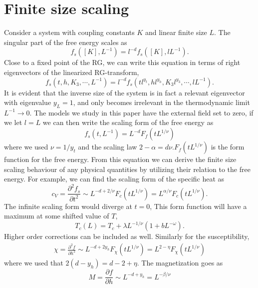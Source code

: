 \section{Finite size scaling}
Consider a system with coupling constants $K$ and linear finite size $L$. 
The singular part of the free energy scales as
\begin{equation}
  f_s([K],L^{-1}) = l^{-d}f_s([K],lL^{-1}).
  \label{}
\end{equation}
Close to a fixed point of the RG, we can write this equation in terms of right eigenvectors of the linearized RG-transform,
\begin{equation}
  f_s(t,h,K_3,\cdots,L^{-1}) = l^{-d}f_s(tl^{y_t},hl^{y_h},K_3 l^{y_3},\cdots,lL^{-1}).
  \label{}
\end{equation}
It is evident that the inverse size of the system is in fact a relevant eigenvector with eigenvalue $y_L = 1$, and only becomes irrelevant in the thermodynamic limit $L^{-1}\rightarrow 0$.
The models we study in this paper have the external field set to zero, if we let $l = L$ we can then write the scaling form of the free energy as
\begin{equation}
  f_s(t,L^{-1}) = L^{-d} F_f(t L^{1/\nu})
  \label{}
\end{equation}
where we used $\nu = 1/y_t$ and the scaling law $2 -\alpha = d\nu$.$F_f(tL^{1/\nu})$ is the form function for the free energy.
From this equation we can derive the finite size scaling behaviour of any physical quantities by utilizing their relation to the free energy. 
For example, we can find the scaling form of the specific heat as
\begin{equation}
  c_V = \frac{\partial ^2 f_s}{\partial t^2} \sim L^{-d +2/\nu}F_{c}(tL^{1/\nu}) = L^{\alpha/\nu} F_{c}(tL^{1/\nu}).
  \label{}
\end{equation}
The infinite scaling form would diverge at $t=0$, 
This form function will have a maximum at some shifted value of $T$, 
\begin{equation}
  T_c(L) = T_c + \lambda L^{-1/\nu}( 1 + bL^{-\omega}).
  \label{}
\end{equation}
Higher order corrections can be included as well.
Similarly for the susceptibility,
\begin{align}
  \chi = \frac{\partial^2 f}{\partial h^2}
  \sim L^{-d +2y_h}F_{\chi}(tL^{1/\nu}) = L^{2-\eta}F_{\chi}(tL^{1/\nu})
  \label{}
\end{align}
where we used that $ 2(d-y_h) = d -2 +\eta$.
The magnetization goes as
\begin{equation}
  M = \frac{\partial f}{\partial h} \sim L^{-d + y_h} = L^{-\beta/\nu}
  \label{}
\end{equation}
